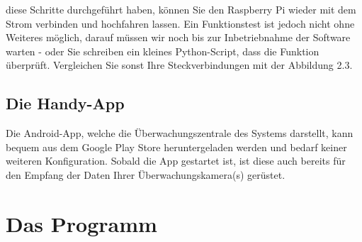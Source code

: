 \documentclass[12pt,a4paper]{scrreprt}
\begin{document}
diese Schritte durchgeführt haben, können Sie den Raspberry Pi wieder mit dem Strom verbinden und hochfahren lassen. Ein Funktionstest ist jedoch nicht ohne Weiteres möglich, darauf müssen wir noch bis zur Inbetriebnahme der Software warten - oder Sie schreiben ein kleines Python-Script, dass die Funktion überprüft. Vergleichen Sie sonst Ihre Steckverbindungen mit der Abbildung 2.3.

\section{Die Handy-App}
Die Android-App, welche die Überwachungszentrale des Systems darstellt, kann bequem aus dem Google Play Store heruntergeladen werden und bedarf keiner weiteren Konfiguration. Sobald die App gestartet ist, ist diese auch bereits für den Empfang der Daten Ihrer Überwachungskamera(s) gerüstet.

\chapter{Das Programm}
\end{document}
